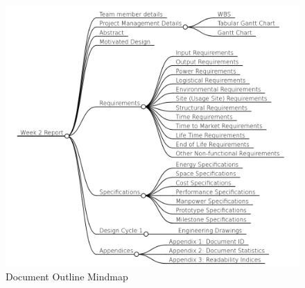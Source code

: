 \documentclass[12pt]{article} %
\begin{document}
\section*{}


\clearpage
\tableofcontents

\clearpage
\listoftables
\listoffigures

\clearpage

\begin{figure}
\centering
\includegraphics[scale=0.5]{mindmap}
\caption{Document Outline Mindmap}
    \label{fig:enter-label}
\end{figure}

\clearpage
\end{document}
